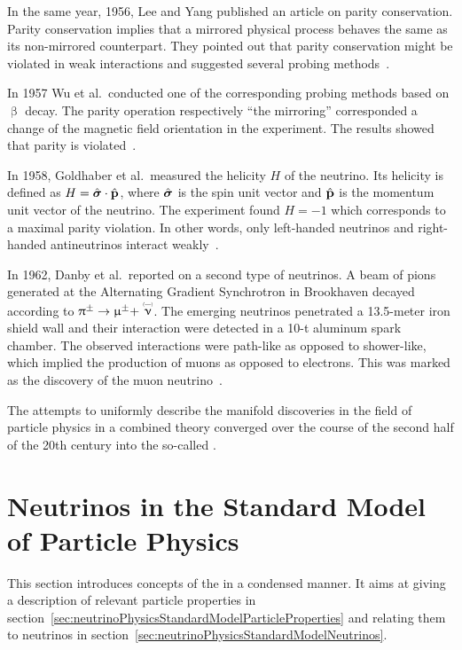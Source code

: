 In the same year, 1956, Lee and Yang published an article on parity conservation. Parity conservation implies that a mirrored physical process behaves the same as its non-mirrored counterpart. They pointed out that parity conservation might be violated in weak interactions and suggested several probing methods~\cite{Lee1956}. 

In 1957 Wu et al.~conducted one of the corresponding probing methods based on $\upbeta$ decay. The parity operation respectively ``the mirroring'' corresponded a change of the magnetic field orientation in the experiment. The results showed that parity is violated~\cite{Wu1957}. 

In 1958, Goldhaber et al.~measured the helicity $H$ of the neutrino. Its helicity is defined as $ H = \hat{\boldsymbol{\mathbf{\sigma}}} \cdot \hat{\boldsymbol{\mathbf{p}}}$, where $\hat{\boldsymbol{\mathbf{\sigma}}}$ is the spin unit vector and $\hat{\boldsymbol{\mathbf{p}}}$ is the momentum unit vector of the neutrino. The experiment found $H = -1$ which corresponds to a maximal parity violation. In other words, only left-handed neutrinos and right-handed antineutrinos interact weakly~\cite{Goldhaber1958}.

In 1962, Danby et al.~reported on a second type of neutrinos. A beam of pions generated at the Alternating Gradient Synchrotron in Brookhaven decayed according to $\uppi^{\pm} \rightarrow \upmu^{\pm} + \maybeaneutrino$. The emerging neutrinos penetrated a 13.5-meter iron shield wall and their interaction were detected in a 10-t aluminum spark chamber. The observed interactions were path-like as opposed to shower-like, which implied the production of muons as opposed to electrons. This was marked as the discovery of the muon neutrino~\cite{Danby1962}.

The attempts to uniformly describe the manifold discoveries in the field of particle physics in a combined theory converged over the course of the second half of the 20th century into the so-called .
    
\section{Neutrinos in the Standard Model of Particle Physics}
\label{sec:neutrinoPhysicsStandardModel}
This section introduces concepts of the  in a condensed manner. It aims at giving a description of relevant particle properties in section~\ref{sec:neutrinoPhysicsStandardModelParticleProperties} and relating them to neutrinos in section~\ref{sec:neutrinoPhysicsStandardModelNeutrinos}.

